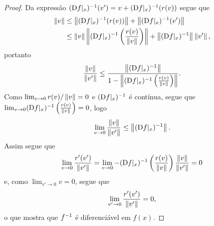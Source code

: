 \begin{proof}
Da expressão $(\mathrm{D} f|_x)^{-1} (v') = v + (\mathrm{D} f|_x)^{-1}(r(v))$ segue que
	\begin{align*}
	\left\Vert{v}\right\Vert &\leq \left\Vert{(\mathrm{D}f|_x)^{-1}(r(v))}\right\Vert + \left\Vert{(\mathrm{D}f|_x)^{-1}(v')}\right\Vert \\
		&\leq \left\Vert{v}\right\Vert \left\Vert{(\mathrm{D}f|_x)^{-1}\left(\frac{r(v)}{\left\Vert{v}\right\Vert}\right) }\right\Vert + \left\Vert{(\mathrm{D}f|_x)^{-1}}\right\Vert \left\Vert{v'}\right\Vert,
	\end{align*}
portanto
	\begin{equation*}
	\frac{\left\Vert{v}\right\Vert}{\left\Vert{v'}\right\Vert} \leq \frac{\left\Vert{(\mathrm{D}f|_x)^{-1}}\right\Vert}{1-\left\Vert{(\mathrm{D}f|_x)^{-1}\left(\frac{r(v)}{\left\Vert{v}\right\Vert}\right)}\right\Vert}.
	\end{equation*}
Como $\lim_{v \to 0} r(v)/\left\Vert{v}\right\Vert = 0$ e $(\mathrm{D} f|_x)^{-1}$ é contínua, segue que $\lim_{v \to 0} (\mathrm{D} f|_x)^{-1} \left(\frac{r(v)}{\left\Vert{v}\right\Vert}\right) = 0$, logo
	\begin{equation*}
	\lim_{v \to 0} \frac{\left\Vert{v}\right\Vert}{\left\Vert{v'}\right\Vert} \leq \left\Vert{(\mathrm{D}f|_x)^{-1}}\right\Vert.
	\end{equation*}
Assim segue que
	\begin{equation*}
	\lim_{v \to 0} \frac{r'(v')}{\left\Vert{v'}\right\Vert} = \lim_{v \to 0} - (\mathrm{D} f|_x)^{-1} \left( \frac{r(v)}{\left\Vert{v}\right\Vert} \right) \frac{\left\Vert{v}\right\Vert}{\left\Vert{v'}\right\Vert}  = 0
	\end{equation*}
e, como $\lim_{v' \to 0} v = 0$, segue que
	\begin{equation*}
	\lim_{v' \to 0} \frac{r'(v')}{\left\Vert{v'}\right\Vert} = 0,
	\end{equation*}
o que mostra que $f^{-1}$ é diferenciável em $f(x)$.

\begin{comment}
Agora, suponhamos que $f$ é fortemente diferenciável em $x$. Seja $\varepsilon \in \R_{>0}$. Como $f$ é fortemente diferenciável em $x$, para algum $\delta' \in \R_{>0}$ vale que, para todos $v,w \in \bola{0}{\delta'}$,
	\begin{equation*}
	\nor{r(w) - r(v)} \leq \varepsilon\nor{w-v}.
	\end{equation*}

Para $v = f\inv(f(x) + v') - f\inv(f(x))$ e $w = f\inv(f(x) + w') - f\inv(f(x))$, tem-se
	\begin{equation*}
	r'(v') - r'(w') = \D f|_x(r(w) - r(v)),
	\end{equation*}
logo
	\begin{equation*}
	\nor{r'(v') - r'(w')} \leq \nor{\D f|_x}\nor{(r(w) - r(v))},
	\end{equation*}
pois $\D f|_x$ é linear e contínua.%
Assim, segue que
	\begin{equation*}
	\nor{r'(v') - r'(w')} \leq \nor{\D f|_x}\varepsilon\nor{w-v}
	\end{equation*}


\end{comment}
\end{proof}
